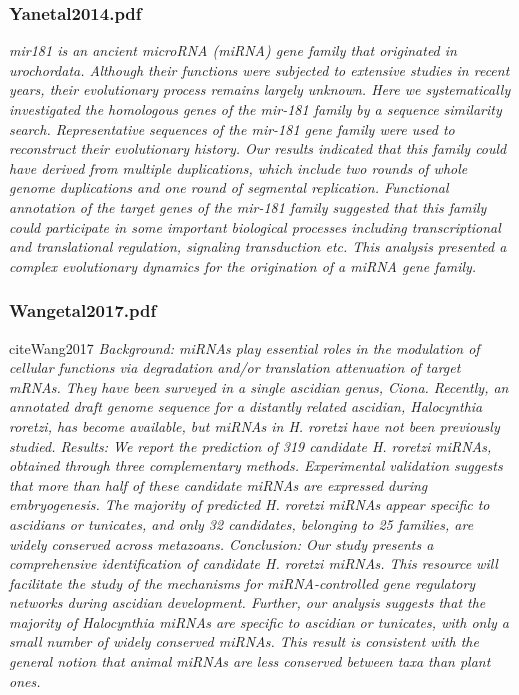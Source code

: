 \documentclass[graybox]{svmult}
\begin{document}
\subsubsection{Yanetal2014.pdf}

\cite{Yang2014}
\textit{mir181 is an ancient microRNA (miRNA) gene family that originated in urochordata. Although their functions were subjected to extensive studies in recent years, their evolutionary process remains largely unknown. Here we systematically investigated the homologous genes of the mir-181 family by a sequence similarity search. Representative sequences of the mir-181 gene family were used to reconstruct their evolutionary history. Our results indicated that this family could have derived from multiple duplications, which include two rounds of whole genome duplications and one round of segmental replication. Functional annotation of the target genes of the mir-181 family suggested that this family could participate in some important biological processes including transcriptional and translational regulation, signaling transduction etc. This analysis presented a complex evolutionary dynamics for the origination of a miRNA gene family.}

\subsubsection{Wangetal2017.pdf}
cite{Wang2017}
\textit{Background: miRNAs play essential roles in the modulation of cellular functions via degradation and/or translation
attenuation of target mRNAs. They have been surveyed in a single ascidian genus, Ciona. Recently, an annotated
draft genome sequence for a distantly related ascidian, Halocynthia roretzi, has become available, but miRNAs in
H. roretzi have not been previously studied.
Results: We report the prediction of 319 candidate H. roretzi miRNAs, obtained through three complementary
methods. Experimental validation suggests that more than half of these candidate miRNAs are expressed during
embryogenesis. The majority of predicted H. roretzi miRNAs appear specific to ascidians or tunicates, and only 32
candidates, belonging to 25 families, are widely conserved across metazoans.
Conclusion: Our study presents a comprehensive identification of candidate H. roretzi miRNAs. This resource
will facilitate the study of the mechanisms for miRNA-controlled gene regulatory networks during ascidian
development. Further, our analysis suggests that the majority of Halocynthia miRNAs are specific to ascidian
or tunicates, with only a small number of widely conserved miRNAs. This result is consistent with the general
notion that animal miRNAs are less conserved between taxa than plant ones.}
\end{document}
